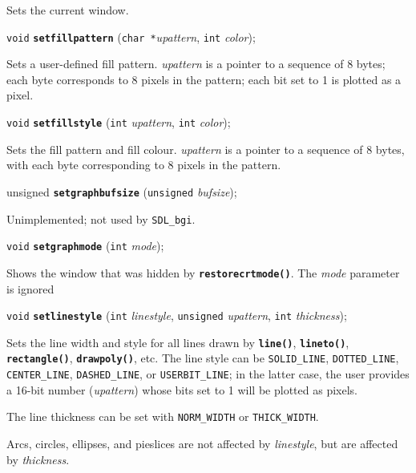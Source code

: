 \documentclass[a4paper,11pt]{article}
\newcommand{\SDLbgi}{\texttt{SDL\_bgi}}
\newcommand{\V}{\texttt{void}}      %
\newcommand{\I}{\texttt{int}}       %
\newcommand{\C}{\texttt{char *}}    %
\newcommand{\func}[1]{\textbf{\texttt{#1}}}  %
\newcommand{\A}[1]{\emph{#1}}       %
\newcommand{\T}[1]{\texttt{#1}}     %
\newenvironment{bgi}
{ %
  \begin{snugshade}
}
{ %
  \end{snugshade}
}
\begin{document}
Sets the current window.


\begin{bgi}
\V{} \func{setfillpattern} (\C{}\A{upattern}, \I{} \A{color}); 
\end{bgi}

Sets a user-defined fill pattern. \A{upattern} is a pointer to a
sequence of 8 bytes; each byte corresponds to 8 pixels in the pattern;
each bit set to 1 is plotted as a pixel.


\begin{bgi}
\V{} \func{setfillstyle} (\I{} \A{upattern}, \I{} \A{color}); 
\end{bgi}

Sets the fill pattern and fill colour. \A{upattern} is a pointer to a
sequence of 8 bytes, with each byte corresponding to 8 pixels in the
pattern.


\begin{bgi}
unsigned \func{setgraphbufsize} (\texttt{unsigned} \A{bufsize}); 
\end{bgi}

Unimplemented; not used by \SDLbgi.


\begin{bgi}
\V{} \func{setgraphmode} (\I{} \A{mode}); 
\end{bgi}

Shows the window that was hidden by \func{restorecrtmode()}. The
\A{mode} parameter is ignored


\begin{bgi}
\V{} \func{setlinestyle} (\I{} \A{linestyle}, \texttt{unsigned}
\A{upattern}, \I{} \A{thickness});
\end{bgi}

Sets the line width and style for all lines drawn by \func{line()},
\func{lineto()}, \func{rectangle()}, \func{drawpoly()}, etc. The line
style can be \T{SOLID\_LINE}, \T{DOTTED\_LINE}, \T{CENTER\_LINE},
\T{DASHED\-\_LINE}, or \T{USERBIT\_LINE}; in the latter case, the user
provides a 16-bit number (\A{upattern}) whose bits set to 1 will be
plotted as pixels.

The line thickness can be set with \T{NORM\_WIDTH} or
\T{THICK\-\_WIDTH}.

Arcs, circles, ellipses, and pieslices are not affected by
\A{linestyle}, but are affected by \A{thickness}.
\end{document}
